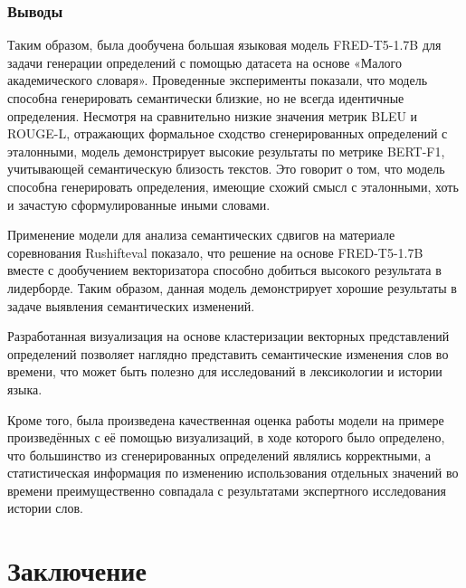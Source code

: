 \documentclass[LI,VKR]{HSEUniversity}
\begin{document}

\subsection*{Выводы}

Таким образом, была дообучена большая языковая модель FRED-T5-1.7B для задачи
генерации определений с помощью датасета на основе «Малого академического словаря».
Проведенные эксперименты показали,
что модель способна генерировать семантически близкие,
но не всегда идентичные определения.
Несмотря на сравнительно низкие значения метрик BLEU и ROUGE-L,
отражающих формальное сходство сгенерированных определений с эталонными,
модель демонстрирует высокие результаты по метрике BERT-F1,
учитывающей семантическую близость текстов.
Это говорит о том, что модель способна генерировать определения,
имеющие схожий смысл с эталонными, хоть и зачастую сформулированные иными словами.

Применение модели для анализа семантических сдвигов на материале соревнования Rushifteval показало,
что решение на основе FRED-T5-1.7B вместе с дообучением векторизатора способно добиться высокого
результата в лидерборде.
Таким образом, данная модель демонстрирует хорошие результаты в задаче выявления семантических изменений.

Разработанная визуализация на основе кластеризации векторных представлений определений позволяет
наглядно представить семантические изменения слов во времени,
что может быть полезно для исследований в лексикологии и истории языка.

Кроме того, была произведена качественная оценка работы модели на примере произведённых
с её помощью визуализаций, в ходе которого было определено, что большинство
из сгенерированных определений являлись корректными, а статистическая информация
по изменению использования отдельных значений во времени преимущественно совпадала
с результатами экспертного исследования истории слов.

\chapter*{Заключение}
\end{document}
